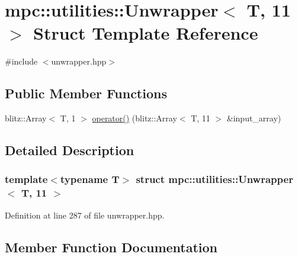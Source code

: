 \hypertarget{structmpc_1_1utilities_1_1_unwrapper_3_01_t_00_0111_01_4}{}\section{mpc\+:\+:utilities\+:\+:Unwrapper$<$ T, 11 $>$ Struct Template Reference}
\label{structmpc_1_1utilities_1_1_unwrapper_3_01_t_00_0111_01_4}


{\ttfamily \#include $<$unwrapper.\+hpp$>$}

\subsection*{Public Member Functions}
\begin{DoxyCompactItemize}
\item 
blitz\+::\+Array$<$ T, 1 $>$ \mbox{\hyperlink{structmpc_1_1utilities_1_1_unwrapper_3_01_t_00_0111_01_4_ababaa4a455c2bc350ecbb94a762ea7c0}{operator()}} (blitz\+::\+Array$<$ T, 11 $>$ \&input\+\_\+array)
\end{DoxyCompactItemize}


\subsection{Detailed Description}
\subsubsection*{template$<$typename T$>$\newline
struct mpc\+::utilities\+::\+Unwrapper$<$ T, 11 $>$}



Definition at line 287 of file unwrapper.\+hpp.



\subsection{Member Function Documentation}
\mbox{\label{structmpc_1_1utilities_1_1_unwrapper_3_01_t_00_0111_01_4_ababaa4a455c2bc350ecbb94a762ea7c0}} 
